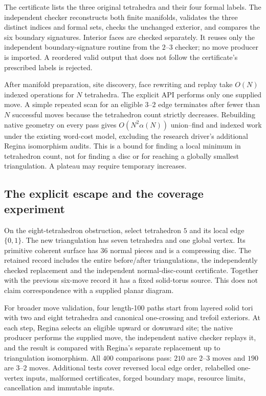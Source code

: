 The certificate lists the three original tetrahedra and their four formal
labels. The independent checker reconstructs both finite manifolds, validates
the three distinct indices and formal sets, checks the unchanged exterior,
and compares the six boundary signatures. Interior faces are checked
separately. It reuses only the independent boundary-signature routine from
the $2$--$3$ checker; no move producer is imported. A reordered valid output
that does not follow the certificate's prescribed labels is rejected.

After manifold preparation, site discovery, face rewriting and replay take
$O(N)$ indexed operations for $N$ tetrahedra. The explicit API performs only
one supplied move. A simple repeated scan for an eligible $3$--$2$ edge
terminates after fewer than $N$ successful moves because the tetrahedron
count strictly decreases. Rebuilding native geometry on every pass gives
$O(N^2\alpha(N))$ union--find and indexed work under the existing word-cost
model, excluding the research driver's additional Regina isomorphism audits.
This is a bound for finding
a local minimum in tetrahedron count, not for finding a disc or for reaching
a globally smallest triangulation. A plateau may require temporary increases.

\subsection{The explicit escape and the coverage experiment}

On the eight-tetrahedron obstruction, select tetrahedron $5$ and its local
edge $\{0,1\}$. The new triangulation has seven tetrahedra and one global
vertex. Its primitive coherent surface has $36$ normal pieces and is a
compressing disc. The retained record includes the entire before/after
triangulations, the independently checked replacement and the independent
normal-disc-count certificate. Together with the previous six-move record
it has a fixed solid-torus source. This does not claim correspondence with
a supplied planar diagram.

For broader move validation, four length-100 paths start from layered solid
tori with two and eight tetrahedra and canonical one-crossing and trefoil
exteriors. At each step, Regina selects an eligible upward or downward
site; the native producer performs the supplied move, the independent native
checker replays it, and the result is compared with Regina's separate
replacement up to triangulation isomorphism. All $400$ comparisons pass:
$210$ are $2$--$3$ moves and $190$ are $3$--$2$ moves. Additional tests cover
reversed local edge order, relabelled one-vertex inputs, malformed certificates,
forged boundary maps, resource limits, cancellation and immutable inputs.

